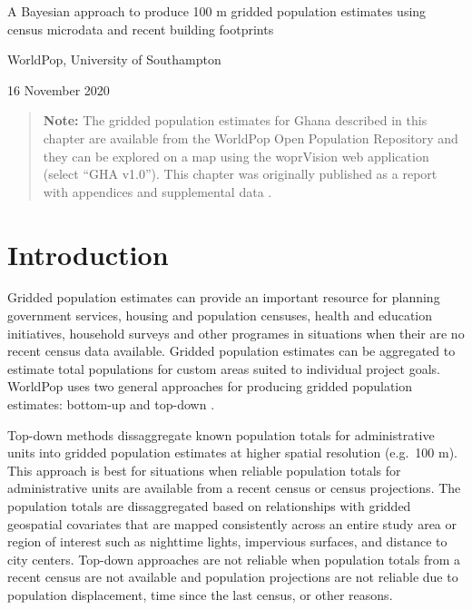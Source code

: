 \documentclass[]{book}
\begin{document}
A Bayesian approach to produce 100 m gridded population estimates using
census microdata and recent building footprints

WorldPop, University of Southampton

16 November 2020

\begin{quote}
\textbf{Note:} The gridded population estimates for Ghana described in
this chapter are available from the WorldPop Open Population Repository
and they can be explored on a map using the woprVision web application
(select ``GHA v1.0''). This chapter was originally published as a report
with appendices and supplemental data \citep{leasure2020approach}.
\end{quote}

\section{Introduction}\label{introduction-1}

Gridded population estimates can provide an important resource for
planning government services, housing and population censuses, health
and education initiatives, household surveys and other programes in
situations when their are no recent census data available. Gridded
population estimates can be aggregated to estimate total populations for
custom areas suited to individual project goals. WorldPop uses two
general approaches for producing gridded population estimates: bottom-up
and top-down \citep{wardrop2018spatially}.

Top-down methods \citep{stevens2015disaggregating} dissaggregate known
population totals for administrative units into gridded population
estimates at higher spatial resolution (e.g.~100 m). This approach is
best for situations when reliable population totals for administrative
units are available from a recent census or census projections. The
population totals are dissaggregated based on relationships with gridded
geospatial covariates that are mapped consistently across an entire
study area or region of interest such as nighttime lights, impervious
surfaces, and distance to city centers. Top-down approaches are not
reliable when population totals from a recent census are not available
and population projections are not reliable due to population
displacement, time since the last census, or other reasons.
\end{document}
